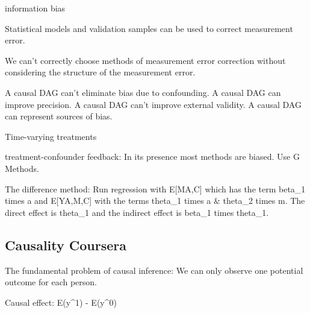 \documentclass[]{book}
\begin{document}
information bias

Statistical models and validation samples can be used to correct measurement error.

We can't correctly choose methods of measurement error correction without considering the structure of the measurement error.

A causal DAG can't eliminate bias due to confounding. A causal DAG can improve precision. A causal DAG can't improve external validity. A causal DAG can represent sources of bias.

Time-varying treatments

treatment-confounder feedback: In its presence most methods are biased. Use G Methods.

The difference method: Run regression with E{[}M\textbar{}A,C{]} which has the term beta\_1 times a and E{[}Y\textbar{}A,M,C{]} with the terms theta\_1 times a \& theta\_2 times m. The direct effect is theta\_1 and the indirect effect is beta\_1 times theta\_1.

\hypertarget{causality-coursera}{%
\subsection{Causality Coursera}\label{causality-coursera}}

The fundamental problem of causal inference: We can only observe one potential outcome for each person.

Causal effect: E(y\^{}1) - E(y\^{}0)


\end{document}
